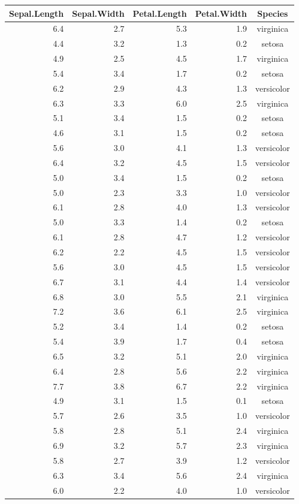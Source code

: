 \documentclass[
]{article}
\begin{document}
\begin{longtable}{rrrrc}
\toprule
Sepal.Length & Sepal.Width & Petal.Length & Petal.Width & Species \\ 
\midrule
6.4 & 2.7 & 5.3 & 1.9 & virginica \\ 
4.4 & 3.2 & 1.3 & 0.2 & setosa \\ 
4.9 & 2.5 & 4.5 & 1.7 & virginica \\ 
5.4 & 3.4 & 1.7 & 0.2 & setosa \\ 
6.2 & 2.9 & 4.3 & 1.3 & versicolor \\ 
6.3 & 3.3 & 6.0 & 2.5 & virginica \\ 
5.1 & 3.4 & 1.5 & 0.2 & setosa \\ 
4.6 & 3.1 & 1.5 & 0.2 & setosa \\ 
5.6 & 3.0 & 4.1 & 1.3 & versicolor \\ 
6.4 & 3.2 & 4.5 & 1.5 & versicolor \\ 
5.0 & 3.4 & 1.5 & 0.2 & setosa \\ 
5.0 & 2.3 & 3.3 & 1.0 & versicolor \\ 
6.1 & 2.8 & 4.0 & 1.3 & versicolor \\ 
5.0 & 3.3 & 1.4 & 0.2 & setosa \\ 
6.1 & 2.8 & 4.7 & 1.2 & versicolor \\ 
6.2 & 2.2 & 4.5 & 1.5 & versicolor \\ 
5.6 & 3.0 & 4.5 & 1.5 & versicolor \\ 
6.7 & 3.1 & 4.4 & 1.4 & versicolor \\ 
6.8 & 3.0 & 5.5 & 2.1 & virginica \\ 
7.2 & 3.6 & 6.1 & 2.5 & virginica \\ 
5.2 & 3.4 & 1.4 & 0.2 & setosa \\ 
5.4 & 3.9 & 1.7 & 0.4 & setosa \\ 
6.5 & 3.2 & 5.1 & 2.0 & virginica \\ 
6.4 & 2.8 & 5.6 & 2.2 & virginica \\ 
7.7 & 3.8 & 6.7 & 2.2 & virginica \\ 
4.9 & 3.1 & 1.5 & 0.1 & setosa \\ 
5.7 & 2.6 & 3.5 & 1.0 & versicolor \\ 
5.8 & 2.8 & 5.1 & 2.4 & virginica \\ 
6.9 & 3.2 & 5.7 & 2.3 & virginica \\ 
5.8 & 2.7 & 3.9 & 1.2 & versicolor \\ 
6.3 & 3.4 & 5.6 & 2.4 & virginica \\ 
6.0 & 2.2 & 4.0 & 1.0 & versicolor \\ 

\end{longtable}
\end{document}
